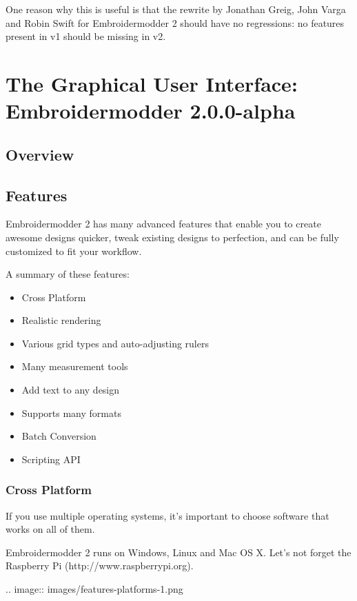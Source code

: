 \documentclass[10pt]{report}
\begin{document}
One reason why this is useful is that the rewrite by Jonathan Greig, John Varga
and Robin Swift for Embroidermodder 2 should have no regressions: no features
present in v1 should be missing in v2.



\chapter{The Graphical User Interface: Embroidermodder 2.0.0-alpha}

\section{Overview}

\section{Features}

Embroidermodder 2 has many advanced features that enable you to create awesome designs quicker, tweak existing designs to perfection, and can be fully customized to fit your workflow.

A summary of these features:

\begin{itemize}
\item Cross Platform
\item Realistic rendering
\item Various grid types and auto-adjusting rulers
\item Many measurement tools
\item Add text to any design
\item Supports many formats
\item Batch Conversion
\item Scripting API
\end{itemize}

\subsection{Cross Platform}

If you use multiple operating systems, it's important to choose software that works on all of them.

Embroidermodder 2 runs on Windows, Linux and Mac OS X. Let's not forget the Raspberry Pi (http://www.raspberrypi.org).

.. image::
   images/features-platforms-1.png
\end{document}
